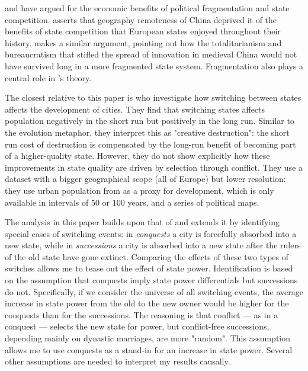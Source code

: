 \documentclass{article}
\begin{document}
\cite{diamond1997} and \cite{landes1969, landes2006} have argued for the economic benefits of political fragmentation and state competition. \cite{diamond1997} asserts that geography 
remoteness of China deprived it of the benefits of state competition that European states enjoyed throughout their history. \cite{landes2006} makes a similar argument, pointing out how the totalitarianism and bureaucratism that stifled the spread of innovation in medieval China would not have survived long in a more fragmented state system. Fragmentation also plays a central role in \cite{cervellati2022}'s theory.

The closest relative to this paper is \cite{schoenholzer2022} who investigate how switching between states affects the development of cities. They find that switching states affects population negatively in the short run but positively in the long run. Similar to the evolution metaphor, they interpret this as "creative destruction": the short run cost of destruction is compensated by the long-run benefit of becoming part of a higher-quality state. However, they do not show explicitly how these improvements in state quality are driven by selection through conflict. They use a dataset with a bigger geographical scope (all of Europe) but lower resolution: they use urban population from \cite{bairoch1988} as a proxy for development, which is only available in intervals of 50 or 100 years, and a series of political maps. 

The analysis in this paper builds upon that of \cite{schoenholzer2022} and extends it by identifying special cases of switching events: in \textit{conquests} a city is forcefully absorbed into a new state, while in \textit{successions} a city is absorbed into a new state after the rulers of the old state have gone extinct. Comparing the effects of these two types of switches allows me to tease out the effect of state power. Identification is based on the assumption that conquests imply state power differentials but successions do not. Specifically, if we consider the universe of all switching events, the average increase in state power from the old to the new owner would be higher for the conquests than for the successions. The reasoning is that conflict --- as in a conquest --- selects the new state for power, but conflict-free successions, depending mainly on dynastic marriages, are more "random". This assumption allows me to use conquests as a stand-in for an increase in state power. Several other assumptions are needed to interpret my results causally.
\end{document}
